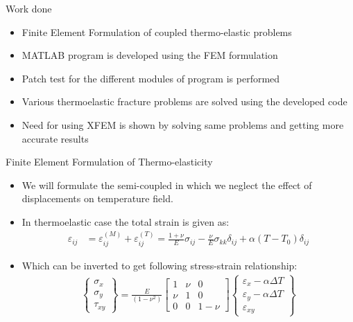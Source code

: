 \documentclass{beamer}
\begin{document}
\begin{frame}[t,fragile]{Work done}
    \begin{itemize}
        \item Finite Element Formulation of coupled thermo-elastic problems
        \item MATLAB program is developed using the FEM formulation
        \item Patch test for the different modules of program is performed
        \item Various thermoelastic fracture problems are solved using the developed code 
        \item Need for using XFEM is shown by solving same problems and getting more accurate results 
    \end{itemize}
\end{frame}
\begin{frame}[t,fragile]{Finite Element Formulation of Thermo-elasticity}
\begin{itemize}
\item We will formulate the semi-coupled in which we neglect the effect of displacements on temperature field.
\item In thermoelastic case the total strain is given as: 
\begin{align}
    \varepsilon_{ij}&=\varepsilon_{ij}^{(M)}+\varepsilon_{ij}^{(T)}
    =\frac{1+\nu}{E}\sigma_{ij}-\frac{\nu}{E}\sigma_{kk}\delta_{ij}+\alpha(T-T_0)\delta_{ij}\nonumber
\end{align}
\item Which can be inverted to get following stress-strain relationship:
    \footnotesize
\begin{align*}
    \begin{Bmatrix}
        \sigma_{x}\\ \sigma_{y}\\ \tau_{xy} 
    \end{Bmatrix} =\frac{E}{(1-\nu^2)}
    \begin{bmatrix}
        1 & \nu & 0 \\ \nu & 1 & 0 \\ 0 & 0 & 1-\nu 
    \end{bmatrix}
    \begin{Bmatrix}
        \varepsilon_{x}-\alpha\Delta T \\ \varepsilon_{y}-\alpha \Delta T \\ \varepsilon_{xy} 
    \end{Bmatrix}
\end{align*}
\end{itemize}

\end{frame}
\end{document}
